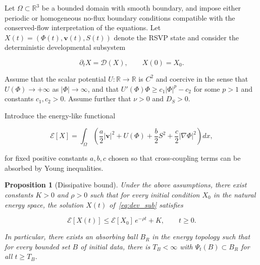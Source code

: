 \documentclass[12pt]{article}
\newtheorem{proposition}{Proposition}[section]
\begin{document}
Let $\Omega \subset \mathbb{R}^3$ be a bounded domain with smooth boundary, and impose either periodic or homogeneous no-flux boundary conditions compatible with the conserved-flow interpretation of the equations. Let $X(t) = (\Phi(t),\mathbf{v}(t),S(t))$ denote the RSVP state and consider the deterministic developmental subsystem

\begin{equation}
\partial_t X = \mathcal{D}(X), \qquad X(0) = X_0.
\label{eq:dev_sub}
\end{equation}

Assume that the scalar potential $U : \mathbb{R} \to \mathbb{R}$ is $C^2$ and coercive in the sense that $U(\Phi) \to +\infty$ as $|\Phi| \to \infty$, and that $U'(\Phi)\Phi \geq c_1|\Phi|^p - c_2$ for some $p > 1$ and constants $c_1, c_2 > 0$. Assume further that $\nu > 0$ and $D_S > 0$.

Introduce the energy-like functional

\begin{equation}
\mathcal{E}[X] = \int_\Omega \left( \frac{a}{2}|\mathbf{v}|^2 + U(\Phi) + \frac{b}{2}S^2 + \frac{c}{2}|\nabla\Phi|^2 \right) dx,
\label{eq:rsvp_energy}
\end{equation}

for fixed positive constants $a, b, c$ chosen so that cross-coupling terms can be absorbed by Young inequalities.

\begin{proposition}[Dissipative bound]
\label{prop:dissipative_bound}
Under the above assumptions, there exist constants $K > 0$ and $\rho > 0$ such that for every initial condition $X_0$ in the natural energy space, the solution $X(t)$ of~\eqref{eq:dev_sub} satisfies

\begin{equation}
\mathcal{E}[X(t)] \leq \mathcal{E}[X_0]\,e^{-\rho t} + K, \qquad t \geq 0.
\label{eq:dissipative_estimate}
\end{equation}

In particular, there exists an absorbing ball $B_R$ in the energy topology such that for every bounded set $B$ of initial data, there is $T_B < \infty$ with $\Psi_t(B) \subset B_R$ for all $t \geq T_B$.
\end{proposition}
\end{document}
